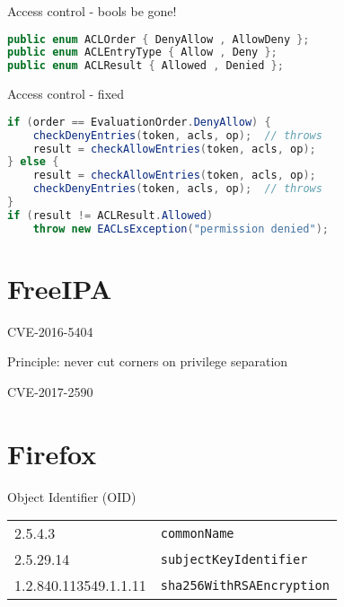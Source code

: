 \documentclass[ignorenonframetext,aspectratio=169]{beamer}
\begin{document}
\begin{frame}[fragile]{Access control - bools be gone!}
\begin{lstlisting}[language=Java]
public enum ACLOrder { DenyAllow , AllowDeny };
public enum ACLEntryType { Allow , Deny };
public enum ACLResult { Allowed , Denied };
\end{lstlisting}
\end{frame}

\begin{frame}[fragile]{Access control - fixed}
\begin{lstlisting}[language=Java]
if (order == EvaluationOrder.DenyAllow) {
    checkDenyEntries(token, acls, op);  // throws
    result = checkAllowEntries(token, acls, op);
} else {
    result = checkAllowEntries(token, acls, op);
    checkDenyEntries(token, acls, op);  // throws
}
if (result != ACLResult.Allowed)
    throw new EACLsException("permission denied");
\end{lstlisting}
\end{frame}




\section{FreeIPA}\label{freeipa}


\begin{frame}[plain]
\huge
CVE-2016-5404
\end{frame}

\begin{frame}[plain]
\huge
Principle: never cut corners on privilege separation
\end{frame}


\begin{frame}[plain]
\huge
CVE-2017-2590
\end{frame}







\section{Firefox}\label{firefox}


\begin{frame}{Object Identifier (OID)}
  \begin{tabular}{l l}
    2.5.4.3 & {\tt commonName} \\
    2.5.29.14 & {\tt subjectKeyIdentifier} \\
    1.2.840.113549.1.1.11 & {\tt sha256WithRSAEncryption} \\
  \end{tabular}
\end{frame}
\end{document}
